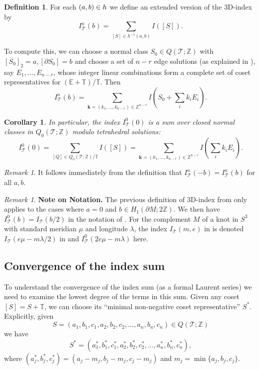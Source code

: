 \documentclass[12pt,reqno]{amsart}  %
\newtheorem{cor}[thm]{Corollary}
\theoremstyle{definition}
\newtheorem{defn}[thm]{Definition}
\theoremstyle{remark}
\newtheorem{rmk}[thm]{Remark}
\newcommand{\TT}{\mathbb{T}}
\def\kk{\boldsymbol{k}}
\newcommand{\CT}{\mathcal{T}}
\def\be{  \begin{equation} }
\def\ee{  \end{equation} }
\newcommand{\T}{\mathcal{T}}
\def\Z{\mathbb Z}
\def\bd{\partial}
\let\Im\relax
\DeclareMathOperator{\Im}{Im}
\def\TT{\mathbb T}   %
\def\EE{\mathbb E}   %
\begin{document}
\begin{defn}
\label{def.Iab}
For each $(a,b) \in \Im h$ we define an extended version of the 3D-index by 
\be I_\T^a(b) = \sum_{[S] \in h^{-1}(a,b)}  I([S]).
\label{index_from_normal_surfaces}
\ee
\end{defn}

To compute this, we can choose a normal class $S_0 \in Q(\T;\Z)$ with 
$[S_0]_2=a,[\bd S_0]=b$ and choose a set of $n-r$ edge solutions (as 
explained in \cite{GHRS}), say $E_1, \ldots, E_{n-r}$, whose integer 
linear combinations form a complete set of coset representatives for 
$(\EE+\TT)/\TT$. Then
\be 
I_\T^a(b) = \sum_{\kk=(k_1,\ldots,k_{n-r}) \in \Z^{n-r}}  
I(S_0+ \textstyle{\sum_i k_i E_i}).
\label{explicit_index_computation}
\ee

\begin{cor}
\label{cor.Izero}
In particular, the index $I^0_\T(0)$ is a sum over closed normal classes 
in $Q_0(\T;\Z)$ modulo tetrahedral solutions: 
\be
I_\T^0(0) =  \sum_{[Q] \in Q_0(\T;\Z)/\TT}   I([S]) 
=\sum_{\kk=(k_1,\ldots,k_{n-r}) \in \Z^{n-r}}  I(\textstyle{\sum_i k_i E_i}).
\label{index0_from_normal_surfaces}
\ee
\end{cor}

\begin{rmk} 
It follows immediately from the definition that $I_\T^a(-b)=I_\T^a(b)$ 
for all $a,b$.
\end{rmk}

\begin{rmk}
{\bf Note on Notation.} The previous definition of 3D-index from 
\cite{GHRS} only applies to the cases where $a=0$ and 
$b \in H_1(\bd M; 2 \Z)$. We then have $I^0_\CT(b) = I_\CT(b/2)$ in the 
notation of \cite{GHRS}. For the complement $M$ of a knot in $S^3$ with 
standard meridian $\mu$ and longitude $\lambda$, the index $I_\CT(m,e)$ 
in \cite{DGG1} is denoted  $I_\CT(e \mu -m \lambda/2)$ in \cite{GHRS} and 
$I^0_\CT(2e \mu - m\lambda)$ here.
\end{rmk}

\subsection{Convergence of the index sum}

To understand the convergence of the index sum (as a formal Laurent series) 
we need to examine the lowest degree of the terms in this sum.  Given any 
coset $[S]=S+ \TT$, we can choose its ``minimal non-negative coset 
representative'' $S^*$. Explicitly,
given 
$$
S=(a_1, b_1, c_1, a_2, b_2, c_2, \ldots , a_n, b_n, c_n) \in  Q(\T;\Z)
$$
we have
$$
S^*=(a^*_1, b^*_1, c^*_1, a^*_2, b^*_2, c^*_2, \ldots , a^*_n, b^*_n, c^*_n),
$$
where 
$(a_j^*,b_j^*,c_j^*)=(a_j-m_j,b_j-m_j,c_j-m_j)$ and $m_j=\min\{a_j,b_j,c_j\}$.
\end{document}
